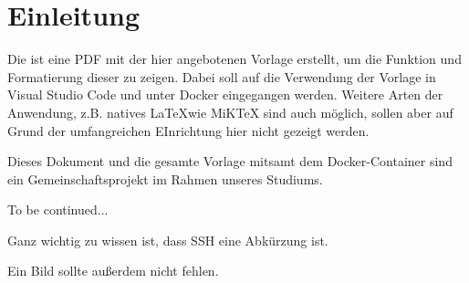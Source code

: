 \section{Einleitung}
Die ist eine PDF mit der hier angebotenen Vorlage erstellt, um die Funktion und Formatierung dieser zu zeigen.
Dabei soll auf die Verwendung der Vorlage in Visual Studio Code und unter Docker eingegangen werden.
Weitere Arten der Anwendung, z.B. natives \LaTeX wie MiKTeX sind auch möglich, sollen aber auf Grund der umfangreichen EInrichtung hier nicht gezeigt werden.

Dieses Dokument und die gesamte Vorlage mitsamt dem Docker-Container sind ein Gemeinschaftsprojekt im Rahmen unseres Studiums.

To be continued...

Ganz wichtig zu wissen ist, dass \ac*{SSH} eine Abkürzung ist.

Ein Bild sollte außerdem nicht fehlen.
\newpage
